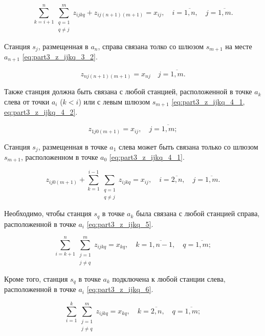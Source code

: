 \begin{equation}
  \label{eq:part3_z_ijkq_3_1}
  \sum\limits_{k=i+1}^{n} \sum\limits_{\substack{q = 1\\ q \neq j}}^m z_{ijkq} + z_{ij(n+1)(m+1)} = x_{ij} ,  \quad i = \overline{1, n}, \quad j = \overline{1, m}.
\end{equation}


Станция $ s_j $, размещенная в $ a_{n} $, справа связана толко со шлюзом $ s_{m + 1} $ на месте $ a_ {n+1}$ \cref{eq:part3_z_ijkq_3_2}. 

\begin{equation}
  \label{eq:part3_z_ijkq_3_2}
  z_{nj(n+1)(m+1)} = x_{nj} \quad j = \overline{1, m}.
\end{equation}

Также станция должна быть связана с любой станцией, расположенной в точке $ a_k $ слева от точки $ a_i $ ($ k <i $) или с левым шлюзом $ s_{m + 1} $ \cref{eq:part3_z_ijkq_4_1, eq:part3_z_ijkq_4_2}.

\begin{equation}
  \label{eq:part3_z_ijkq_4_1}
  z_{1j0(m+1)}= x_{ij}, \quad j = \overline{1, m};
\end{equation}

Станция $s_j$, размещенная в точке $a_{1}$ слева может быть связана только со шлюзом $s_{m+1}$, расположенном в точке $a_0$ \cref{eq:part3_z_ijkq_4_1}.

\begin{equation}
  \label{eq:part3_z_ijkq_4_2}
  z_{ij0(m+1)} + \sum\limits_{k=1}^{i-1} \sum\limits_{\substack{q = 1\\ q \neq j}} z_{ijkq}= x_{ij}, \quad i = \overline{2, n}, \quad j = \overline{1, m}.
\end{equation}

Необходимо, чтобы станция $ s_q $ в точке $ a_k $ была связана с любой станцией справа, расположенной в точке $ a_i $ \cref{eq:part3_z_ijkq_5}.

\begin{equation}
  \label{eq:part3_z_ijkq_5}
  \sum\limits_{i=k+1}^{n} \sum\limits_{\substack{j=1 \\ j \neq q}}^m z_{ijkq} = x_{kq} , \quad k = \overline{1, n-1}, \quad q = \overline{1, m};
\end{equation}

Кроме того, станция $ s_q $ в точке $ a_k $ подключена к любой станции слева, расположенной в точке $ a_i $ \cref {eq:part3_z_ijkq_6}. 

\begin{equation}
  \label{eq:part3_z_ijkq_6}
  \sum\limits_{i=1}^{k} \sum\limits_{\substack{j=1 \\ j \neq q}}^m z_{ijkq} = x_{kq} , \quad k = \overline{2, n}, \quad q = \overline{1, m};
\end{equation}

